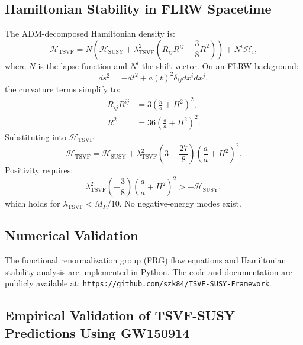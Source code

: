 \documentclass[twocolumn,superscriptaddress,floatfix]{revtex4-2}
\begin{document}
\subsection{Hamiltonian Stability in FLRW Spacetime}
\label{app:hamiltonian}

The ADM-decomposed Hamiltonian density is:
\begin{equation}
\mathcal{H}_{\text{TSVF}} = N\left(\mathcal{H}_{\text{SUSY}} + \lambda_{\text{TSVF}}^2\left(R_{ij}R^{ij} - \frac{3}{8}R^2\right)\right) + N^i\mathcal{H}_i,
\end{equation}
where \(N\) is the lapse function and \(N^i\) the shift vector. On an FLRW background:
\begin{equation}
ds^2 = -dt^2 + a(t)^2\delta_{ij}dx^i dx^j,
\end{equation}
the curvature terms simplify to:
\begin{align}
R_{ij}R^{ij} &= 3\left(\frac{\ddot{a}}{a} + H^2\right)^2, \\
R^2 &= 36\left(\frac{\ddot{a}}{a} + H^2\right)^2.
\end{align}
Substituting into \(\mathcal{H}_{\text{TSVF}}\):
\begin{equation}
\mathcal{H}_{\text{TSVF}} = \mathcal{H}_{\text{SUSY}} + \lambda_{\text{TSVF}}^2\left(3 - \frac{27}{8}\right)\left(\frac{\ddot{a}}{a} + H^2\right)^2.
\end{equation}
Positivity requires:
\begin{equation}
\lambda_{\text{TSVF}}^2\left(-\frac{3}{8}\right)\left(\frac{\ddot{a}}{a} + H^2\right)^2 > -\mathcal{H}_{\text{SUSY}},
\end{equation}
which holds for \(\lambda_{\text{TSVF}} < M_P/10\). No negative-energy modes exist.


\subsection{Numerical Validation}
\label{app:numerics}

The functional renormalization group (FRG) flow equations and Hamiltonian stability analysis are implemented in Python. The code and documentation are publicly available at:  
\texttt{https://github.com/szk84/TSVF-SUSY-Framework}.  

\subsection{Empirical Validation of TSVF-SUSY Predictions Using GW150914}\label{sec:empirical_validation_gw150914}
\end{document}
